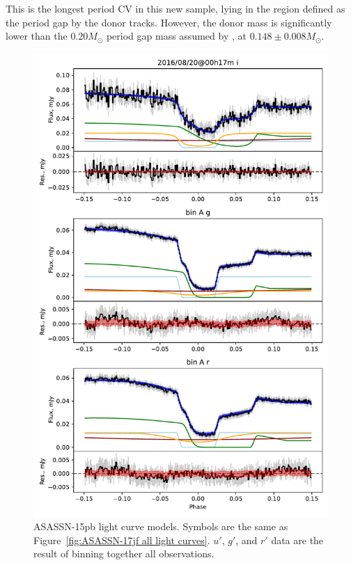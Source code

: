 This is the longest period CV in this new sample, lying in the region defined as the period gap by the \citet{knigge11} donor tracks. However, the donor mass is significantly lower than the $0.20 M_\odot$ period gap mass assumed by \citet{knigge11}, at $0.148\pm0.008 M_\odot$.

%     

\begin{figure}
    \centering
    \includegraphics[width=\textwidth]{figures/results/ASASSN-15pb/ASASSN-15pb_1.pdf}
    \caption{ASASSN-15pb light curve models. Symbols are the same as Figure~\ref{fig:ASASSN-17jf all light curves}. $u'$, $g'$, and $r'$ data are the result of binning together all observations.}
    \label{fig:ASASSN-15pb all light curves}
\end{figure}
